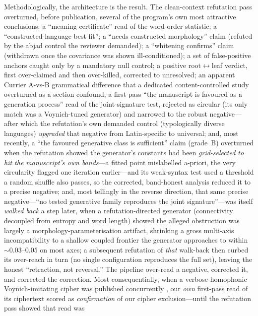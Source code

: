 \documentclass[11pt]{article}
\begin{document}
Methodologically, the architecture is the result. The clean-context refutation pass
overturned, before publication, several of the program's own most attractive
conclusions: a ``meaning certificate'' read of the word-order statistic; a
``constructed-language best fit''; a ``needs constructed morphology'' claim (refuted by
the abjad control the reviewer demanded); a ``whitening confirms'' claim (withdrawn
once the covariance was shown ill-conditioned); a set of false-positive anchors caught
only by a mandatory null control; a positive root$\leftrightarrow$leaf verdict, first
over-claimed and then over-killed, corrected to unresolved; an apparent Currier
A-vs-B grammatical difference that a dedicated content-controlled study overturned as a
section confound; a first-pass ``the manuscript is favoured as a
generation process'' read of the joint-signature test, rejected as circular (its only
match was a Voynich-tuned generator) and narrowed to the robust negative---after which
the refutation's own demanded control (typologically diverse languages) \emph{upgraded}
that negative from Latin-specific to universal; and, most recently, a ``the favoured
generative class is sufficient'' claim (grade~B) overturned when the refutation showed the
generator's constants had been \emph{grid-selected to hit the manuscript's own bands}---a
fitted point mislabelled a-priori, the very circularity flagged one iteration earlier---and
its weak-syntax test used a threshold a random shuffle also passes, so the corrected,
band-honest analysis reduced it to a precise negative; and, most tellingly in the reverse
direction, that same precise negative---``no tested generative family reproduces the joint
signature''---was itself \emph{walked back} a step later, when a refutation-directed
generator (connectivity decoupled from entropy and word length) showed the alleged
obstruction was largely a morphology-parameterisation artifact, shrinking a gross
multi-axis incompatibility to a shallow coupled frontier the generator approaches to within
$\sim\!0.03$--$0.05$ on most axes; a subsequent refutation of \emph{that} walk-back then
curbed its over-reach in turn (no single configuration reproduces the full set), leaving the
honest ``retraction, not reversal.'' The pipeline over-read a negative, corrected it, and
corrected the correction. Most consequentially, when a
verbose-homophonic Voynich-imitating cipher was published concurrently
\citep{greshko2025naibbe}, our \emph{own} first-pass read of its ciphertext scored as
\emph{confirmation} of our cipher exclusion---until the refutation pass showed that read was
\end{document}
